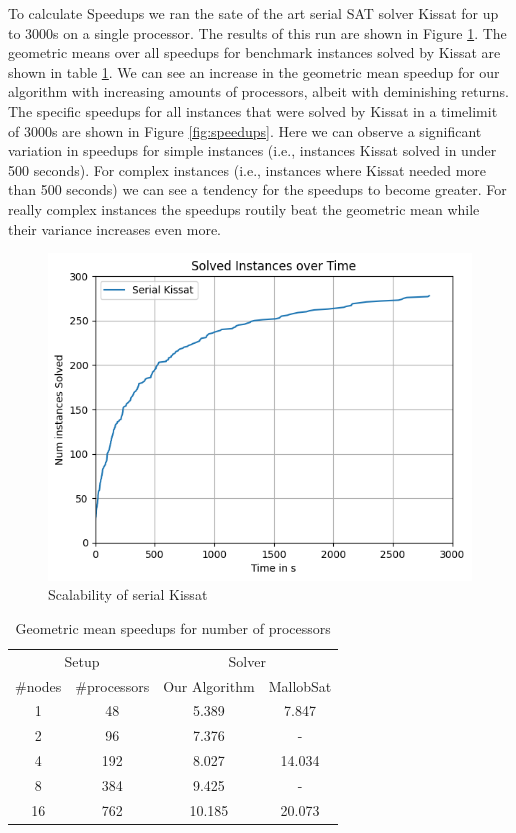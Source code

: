 \documentclass[12pt,a4paper,twoside]{scrartcl}
\numberwithin{equation}{section}
\begin{document}
To calculate Speedups we ran the sate of the art serial SAT solver Kissat for up to 3000s on a single processor. The results of this run are shown in Figure \ref{fig:runtimeSerial}. The geometric means over all speedups for benchmark instances solved by Kissat are shown in table \ref{tab:speedups}. We can see an increase in the geometric mean speedup for our algorithm with increasing amounts of processors, albeit with deminishing returns. The specific speedups for all instances that were solved by Kissat in a timelimit of 3000s are shown in Figure \ref{fig:speedups}. Here we can observe a significant variation in speedups for simple instances (i.e., instances Kissat solved in under 500 seconds). For complex instances (i.e., instances where Kissat needed more than 500 seconds) we can see a tendency for the speedups to become greater. For really complex instances the speedups routily beat the geometric mean while their variance increases even more.

\begin{figure}
  \center
  \includegraphics{plots/cumulative_runtime/runtime_serial.png}
  \caption{Scalability of serial Kissat}
  \label{fig:runtimeSerial}
\end{figure}

\begin{table}
  \center
  \begin{tabular}{ cccc }
    \toprule
    \multicolumn{2}{c}{Setup} & \multicolumn{2}{c}{Solver}\\
    \#nodes   & \#processors   & Our Algorithm  & MallobSat \\
    \midrule
    1  & 48  & 5.389  & 7.847\\
    2  & 96  & 7.376   & -\\
    4  & 192 & 8.027   & 14.034\\
    8  & 384 & 9.425    & -\\
    16 & 762 & 10.185   & 20.073\\
    \bottomrule
  \end{tabular}
  \caption{Geometric mean speedups for number of processors}
  \label{tab:speedups}
\end{table}
\end{document}
